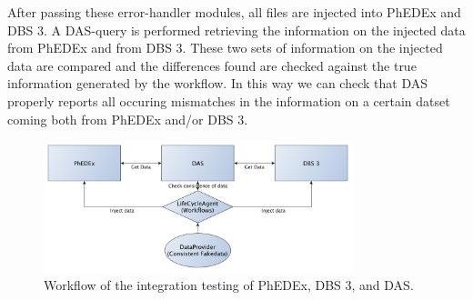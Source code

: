 After passing these error-handler modules, all files are injected into PhEDEx
and DBS 3. A DAS-query is performed retrieving the information on the
injected data from PhEDEx and from DBS 3.
These two sets of information on the injected data are compared and the differences found
are checked against the true information generated by the workflow.
In this way we can check that DAS properly reports all occuring mismatches in
the information on a certain datset coming both from PhEDEx and/or DBS 3.

\begin{figure}[h]
 \centering
   \includegraphics[width=0.8\textwidth]{IntegrationTests.pdf}
       \caption{Workflow of the integration testing of PhEDEx, DBS 3, and DAS.}
 \label{fig:Integ-Phedex-DBS-DAS}
\end{figure}
